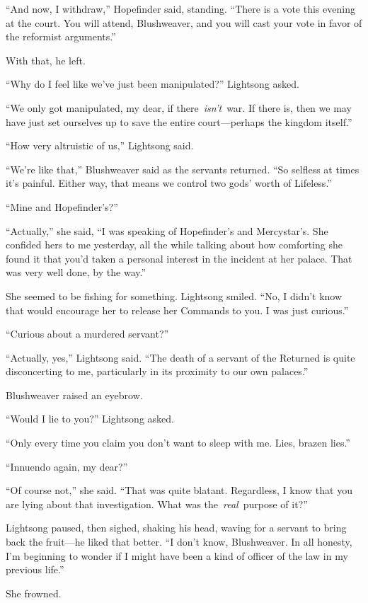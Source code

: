 “And now, I withdraw,” Hopefinder said, standing. “There is a vote this evening at the court. You will attend, Blushweaver, and you will cast your vote in favor of the reformist arguments.”

With that, he left.

“Why do I feel like we’ve just been manipulated?” Lightsong asked.

“We only got manipulated, my dear, if there~\textit{isn’t}~war. If there is, then we may have just set ourselves up to save the entire court—perhaps the kingdom itself.”

“How very altruistic of us,” Lightsong said.

“We’re like that,” Blushweaver said as the servants returned. “So selfless at times it’s painful. Either way, that means we control two gods’ worth of Lifeless.”

“Mine and Hopefinder’s?”

“Actually,” she said, “I was speaking of Hopefinder’s and Mercystar’s. She confided hers to me yesterday, all the while talking about how comforting she found it that you’d taken a personal interest in the incident at her palace. That was very well done, by the way.”

She seemed to be fishing for something. Lightsong smiled. “No, I didn’t know that would encourage her to release her Commands to you. I was just curious.”

“Curious about a murdered servant?”

“Actually, yes,” Lightsong said. “The death of a servant of the Returned is quite disconcerting to me, particularly in its proximity to our own palaces.”

Blushweaver raised an eyebrow.

“Would I lie to you?” Lightsong asked.

“Only every time you claim you don’t want to sleep with me. Lies, brazen lies.”

“Innuendo again, my dear?”

“Of course not,” she said. “That was quite blatant. Regardless, I know that you are lying about that investigation. What was the~\textit{real}~purpose of it?”

Lightsong paused, then sighed, shaking his head, waving for a servant to bring back the fruit—he liked that better. “I don’t know, Blushweaver. In all honesty, I’m beginning to wonder if I might have been a kind of officer of the law in my previous life.”

She frowned.

